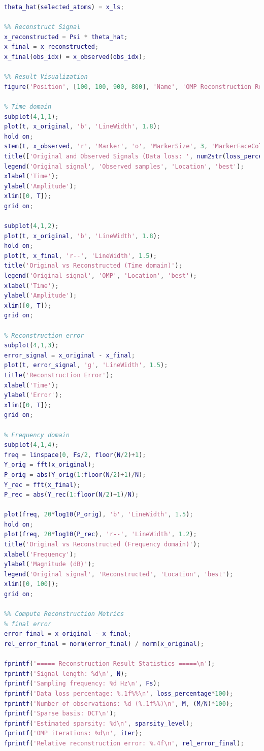 \documentclass[12pt]{ctexart}
\begin{document}
\begin{lstlisting}[language=Matlab]
% build sparse coefficient estimate
theta_hat(selected_atoms) = x_ls;

%% Reconstruct Signal
x_reconstructed = Psi * theta_hat;
x_final = x_reconstructed;
x_final(obs_idx) = x_observed(obs_idx);

%% Result Visualization
figure('Position', [100, 100, 900, 800], 'Name', 'OMP Reconstruction Results');

% Time domain
subplot(4,1,1);
plot(t, x_original, 'b', 'LineWidth', 1.8);
hold on;
stem(t, x_observed, 'r', 'Marker', 'o', 'MarkerSize', 3, 'MarkerFaceColor', 'r');
title(['Original and Observed Signals (Data loss: ', num2str(loss_percentage*100), '%, Noise level: ', num2str(noise_level), ')']);
legend('Original signal', 'Observed samples', 'Location', 'best');
xlabel('Time');
ylabel('Amplitude');
xlim([0, T]);
grid on;

subplot(4,1,2);
plot(t, x_original, 'b', 'LineWidth', 1.8);
hold on;
plot(t, x_final, 'r--', 'LineWidth', 1.5);
title('Original vs Reconstructed (Time domain)');
legend('Original signal', 'OMP', 'Location', 'best');
xlabel('Time');
ylabel('Amplitude');
xlim([0, T]);
grid on;

% Reconstruction error
subplot(4,1,3);
error_signal = x_original - x_final;
plot(t, error_signal, 'g', 'LineWidth', 1.5);
title('Reconstruction Error');
xlabel('Time');
ylabel('Error');
xlim([0, T]);
grid on;

% Frequency domain
subplot(4,1,4);
freq = linspace(0, Fs/2, floor(N/2)+1);
Y_orig = fft(x_original);
P_orig = abs(Y_orig(1:floor(N/2)+1)/N);
Y_rec = fft(x_final);
P_rec = abs(Y_rec(1:floor(N/2)+1)/N);

plot(freq, 20*log10(P_orig), 'b', 'LineWidth', 1.5);
hold on;
plot(freq, 20*log10(P_rec), 'r--', 'LineWidth', 1.2);
title('Original vs Reconstructed (Frequency domain)');
xlabel('Frequency');
ylabel('Magnitude (dB)');
legend('Original signal', 'Reconstructed', 'Location', 'best');
xlim([0, 100]);
grid on;

%% Compute Reconstruction Metrics
% final error
error_final = x_original - x_final;
rel_error_final = norm(error_final) / norm(x_original);

fprintf('===== Reconstruction Result Statistics =====\n');
fprintf('Signal length: %d\n', N);
fprintf('Sampling frequency: %d Hz\n', Fs);
fprintf('Data loss percentage: %.1f%%\n', loss_percentage*100);
fprintf('Number of observations: %d (%.1f%%)\n', M, (M/N)*100);
fprintf('Sparse basis: DCT\n');
fprintf('Estimated sparsity: %d\n', sparsity_level);
fprintf('OMP iterations: %d\n', iter);
fprintf('Relative reconstruction error: %.4f\n', rel_error_final);
\end{lstlisting}
\end{document}
